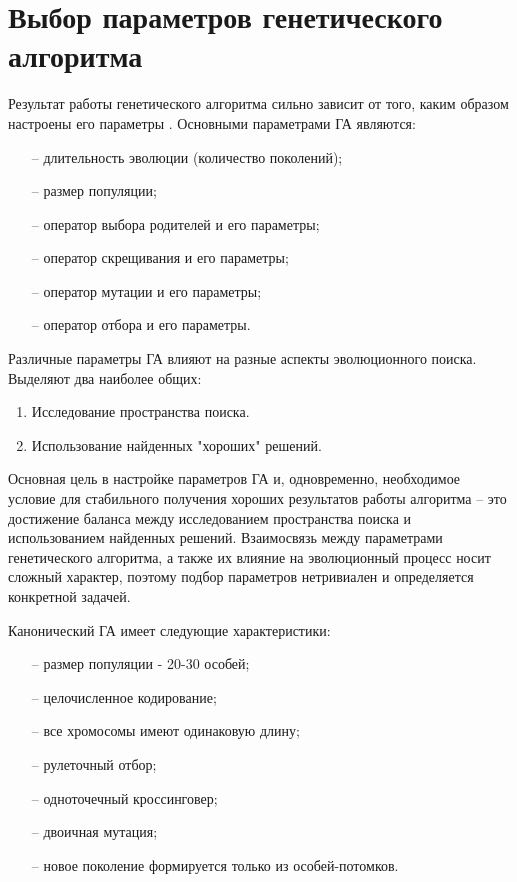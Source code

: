\section{Выбор параметров генетического алгоритма}
Результат работы генетического алгоритма сильно зависит от того, каким образом настроены его параметры \cite{charsGA}. Основными параметрами ГА являются:
\begin{itemize}
	\item[--] длительность эволюции (количество поколений);
	\item[--] размер популяции;
	\item[--] оператор выбора родителей и его параметры;
	\item[--] оператор скрещивания и его параметры;
	\item[--] оператор мутации и его параметры;
	\item[--] оператор отбора и его параметры.
\end{itemize}

Различные параметры ГА влияют на разные аспекты эволюционного поиска. Выделяют два наиболее общих:
\begin{enumerate}
	\item Исследование пространства поиска.
	\item Использование найденных "хороших" решений.
\end{enumerate}

Основная цель в настройке параметров ГА и, одновременно, необходимое условие для стабильного получения хороших результатов работы алгоритма – это достижение баланса между исследованием пространства поиска и использованием найденных решений. Взаимосвязь между параметрами генетического алгоритма, а также их влияние на эволюционный процесс носит сложный характер, поэтому подбор параметров нетривиален и определяется конкретной задачей.

Канонический ГА имеет следующие характеристики:
\begin{itemize}
	\item[--] размер популяции - 20-30 особей;
	\item[--] целочисленное кодирование;
	\item[--] все хромосомы имеют одинаковую длину;
	\item[--] рулеточный отбор;
	\item[--] одноточечный кроссинговер;
	\item[--] двоичная мутация;
	\item[--] новое поколение формируется только из особей-потомков.
\end{itemize}

